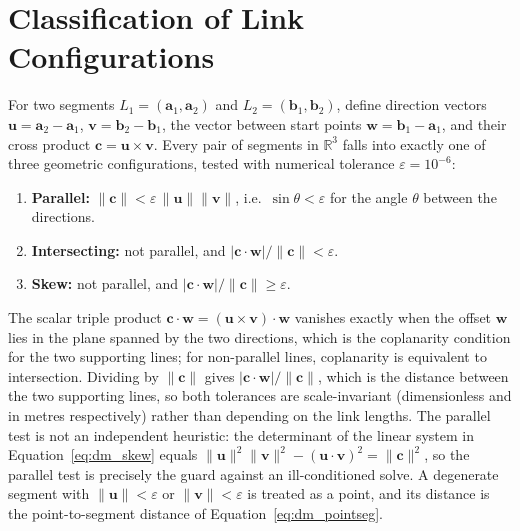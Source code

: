 \section{Classification of Link Configurations}\label{sec:dm_classification}

For two segments $L_1 = (\mathbf{a}_1, \mathbf{a}_2)$ and $L_2 = (\mathbf{b}_1, \mathbf{b}_2)$, define
direction vectors $\mathbf{u} = \mathbf{a}_2 - \mathbf{a}_1$, $\mathbf{v} = \mathbf{b}_2 - \mathbf{b}_1$,
the vector between start points $\mathbf{w} = \mathbf{b}_1 - \mathbf{a}_1$, and their cross product
$\mathbf{c} = \mathbf{u} \times \mathbf{v}$. Every pair of segments in $\mathbb{R}^3$ falls into
exactly one of three geometric configurations, tested with numerical tolerance
$\varepsilon = 10^{-6}$:
\begin{enumerate}
    \item \textbf{Parallel:} $\lVert \mathbf{c} \rVert < \varepsilon\,\lVert \mathbf{u} \rVert \lVert \mathbf{v} \rVert$,
    i.e.\ $\sin\theta < \varepsilon$ for the angle $\theta$ between the directions.
    \item \textbf{Intersecting:} not parallel, and $\lvert \mathbf{c} \cdot \mathbf{w} \rvert / \lVert \mathbf{c} \rVert < \varepsilon$.
    \item \textbf{Skew:} not parallel, and $\lvert \mathbf{c} \cdot \mathbf{w} \rvert / \lVert \mathbf{c} \rVert \geq \varepsilon$.
\end{enumerate}
The scalar triple product $\mathbf{c} \cdot \mathbf{w} = (\mathbf{u} \times \mathbf{v}) \cdot \mathbf{w}$
vanishes exactly when the offset $\mathbf{w}$ lies in the plane spanned by the two directions, which is
the coplanarity condition for the two supporting lines; for non-parallel lines, coplanarity is
equivalent to intersection. Dividing by $\lVert \mathbf{c} \rVert$ gives
$\lvert \mathbf{c} \cdot \mathbf{w} \rvert / \lVert \mathbf{c} \rVert$, which is the distance between the two
supporting lines, so both tolerances are scale-invariant (dimensionless and in metres respectively)
rather than depending on the link lengths. The parallel test is not an independent heuristic: the
determinant of the linear system in Equation~\eqref{eq:dm_skew} equals
$\lVert \mathbf{u} \rVert^2 \lVert \mathbf{v} \rVert^2 - (\mathbf{u} \cdot \mathbf{v})^2 = \lVert \mathbf{c} \rVert^2$,
so the parallel test is precisely the guard against an ill-conditioned solve. A degenerate segment
with $\lVert \mathbf{u} \rVert < \varepsilon$ or $\lVert \mathbf{v} \rVert < \varepsilon$ is treated as a point, and its
distance is the point-to-segment distance of Equation~\eqref{eq:dm_pointseg}.

